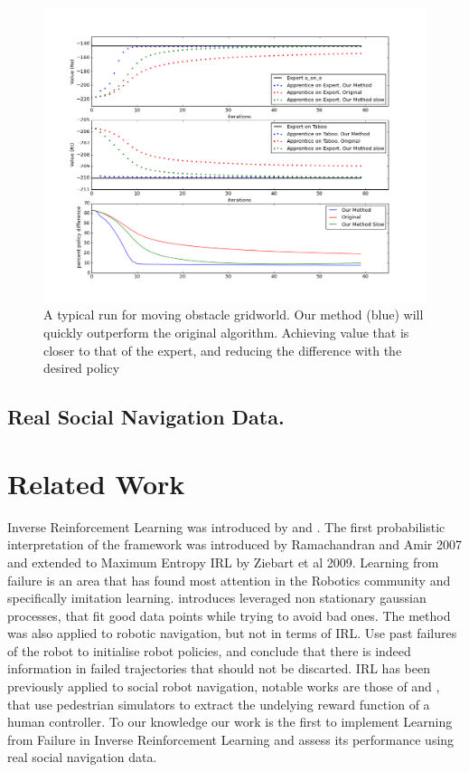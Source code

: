 \documentclass[letterpaper]{article}
\begin{document}
\begin{figure}[t]
  \centering
  \includegraphics[width=0.9\columnwidth]{images/testgraph}
  \caption{A typical run for moving obstacle gridworld. Our method (blue) will quickly outperform the original algorithm. Achieving value that is closer to that of the expert, and reducing the difference with the desired policy\label{fig:results}}
\end{figure}

\subsection{Real Social Navigation Data.}




\section{Related Work}

Inverse Reinforcement Learning was introduced by \cite{ng2000algorithms} and \cite{abbeel2004apprenticeship}. The first probabilistic interpretation of the framework was introduced by Ramachandran and Amir 2007 and extended to Maximum Entropy IRL by Ziebart et al 2009. 	Learning from failure is an area that has found most attention in the Robotics community and specifically imitation learning. \cite{choi2015} introduces leveraged non stationary gaussian processes, that fit good data points while trying to avoid bad ones. The method was also applied to robotic navigation, but not in terms of IRL. \cite{grollman2012robot} Use past failures of the robot to initialise robot policies, and conclude that there is indeed information in failed trajectories that should not be discarted. IRL has been previously applied to social robot navigation, notable works are those of \cite{henry2010learning} and \cite{vasquez2014inverse}, that use pedestrian simulators to extract the undelying reward function of a human controller. To our knowledge our work is the first to implement Learning from Failure in Inverse Reinforcement Learning and assess its performance using real social navigation data.
\end{document}
